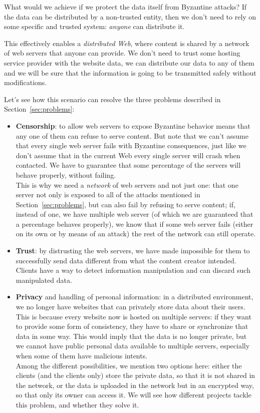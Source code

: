 \documentclass[mscthesis]{usiinfthesis}
\begin{document}
What would we achieve if we protect the data itself from Byzantine attacks? If the data can be distributed by a non-trusted entity, then we don't need to rely on some specific and trusted system: \textit{anyone} can distribute it.

This effectively enables a \emph{distributed Web}, where content is shared by a network of web servers that anyone can provide. We don't need to trust some hosting service provider with the website data, we can distribute our data to any of them and we will be sure that the information is going to be transmitted safely without modifications.

Let's see how this scenario can resolve the three problems described in Section~\ref{sec:problems}:
\begin{itemize}
	\item \textbf{Censorship}: to allow web servers to expose Byzantine behavior means that any one of them can refuse to serve content. But note that we can't assume that every single web server fails with Byzantine consequences, just like we don't assume that in the current Web every single server will crash when contacted. We have to guarantee that some percentage of the servers will behave properly, without failing.\\
	This is why we need a \emph{network} of web servers and not just one: that one server not only is exposed to all of the attacks mentioned in Section~\ref{sec:problems}, but can also fail by refusing to serve content; if, instead of one, we have multiple web server (of which we are guaranteed that a percentage behaves properly), we know that if some web server fails (either on its own or by means of an attack) the rest of the network can still operate.

	\item \textbf{Trust}: by distrusting the web servers, we have made impossible for them to successfully send data different from what the content creator intended. Clients have a way to detect information manipulation and can discard such manipulated data.

	\item \textbf{Privacy} and handling of personal information: in a distributed environment, we no longer have websites that can privately store data about their users. This is because every website now is hosted on multiple servers: if they want to provide some form of consistency, they have to share or synchronize that data in some way. This would imply that the data is no longer private, but we cannot have public personal data available to multiple servers, especially when some of them have malicious intents.\\
	Among the different possibilities, we mention two options here: either the clients (and the clients only) store the private data, so that it is not shared in the network, or the data is uploaded in the network but in an encrypted way, so that only its owner can access it. We will see how different projects tackle this problem, and whether they solve it.
\end{itemize}
\end{document}
